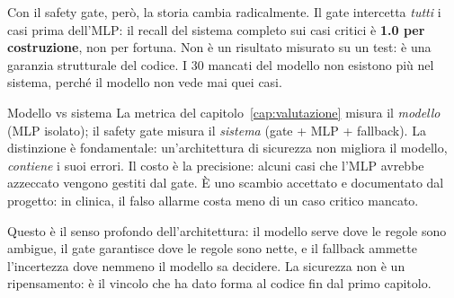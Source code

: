 Con il safety gate, però, la storia cambia radicalmente. Il gate intercetta
\emph{tutti} i casi  prima dell'MLP: il recall del sistema
completo sui casi critici è \textbf{1.0 per costruzione}, non per fortuna.
Non è un risultato misurato su un test: è una garanzia strutturale del
codice. I 30 mancati del modello non esistono più nel sistema, perché il
modello non vede mai quei casi.

\begin{esempio}{Modello vs sistema}
La metrica del capitolo~\ref{cap:valutazione} misura il \emph{modello}
(MLP isolato); il safety gate misura il \emph{sistema} (gate + MLP +
fallback). La distinzione è fondamentale: un'architettura di sicurezza
non migliora il modello, \emph{contiene} i suoi errori. Il costo è la
precisione: alcuni casi  che l'MLP avrebbe azzeccato vengono
gestiti dal gate. È uno scambio accettato e documentato dal progetto: in
clinica, il falso allarme costa meno di un caso critico mancato.
\end{esempio}

Questo è il senso profondo dell'architettura: il modello serve dove le
regole sono ambigue, il gate garantisce dove le regole sono nette, e il
fallback ammette l'incertezza dove nemmeno il modello sa decidere. La
sicurezza non è un ripensamento: è il vincolo che ha dato forma al codice
fin dal primo capitolo.
